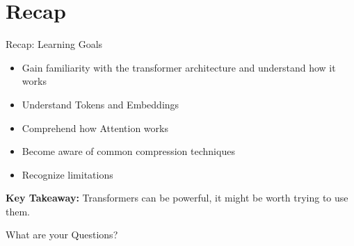 % 

\section{Recap}


\begin{frame}[c]{Recap: Learning Goals} 
    \large
    \begin{itemize}[<+(1)->]
        \item Gain familiarity with the transformer architecture and understand how it works
        \item Understand Tokens and Embeddings
        \item Comprehend how Attention works
        \item Become aware of common compression techniques
        \item Recognize limitations
    \end{itemize}
    \pause
    \textbf{Key Takeaway:} Transformers can be powerful, it might be worth trying
    to use them.
\end{frame}

\addtocounter{framenumber}{1}
\begin{frame}[standout]
    \huge
    What are your Questions?
\end{frame}
